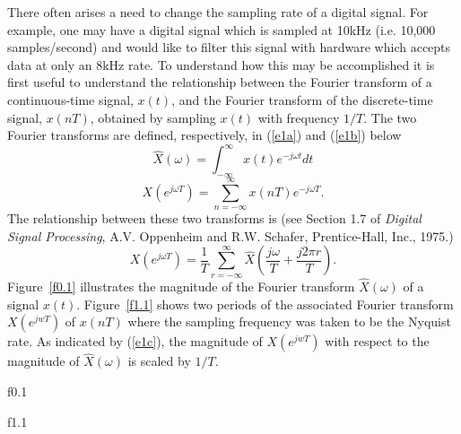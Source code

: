 	There often arises a need to change the sampling
rate of a digital signal.  For example, one may have a digital
signal which is sampled at 10kHz (i.e. 10,000 samples/second)
and would like to filter this signal with hardware 
which accepts data at only an 8kHz rate.  
To understand how this may be accomplished 
it is first useful to understand the relationship
between the Fourier transform of a continuous-time signal, $x(t)$,
and the Fourier transform of the discrete-time signal, $x(nT)$,
obtained by sampling $x(t)$ with frequency $1/T$.
The two Fourier transforms are defined, respectively, in (\ref{e1a})
and (\ref{e1b}) below
%
\begin{equation}
\hat{X}(\omega)=\int_{-\infty}^{\infty}x(t)e^{-j\omega t}dt
\label{e1a}
\end{equation}
%
%
\begin{equation}
X(e^{j\omega T})=\sum_{n=-\infty}^{\infty}x(nT)e^{-j\omega T}.
\label{e1b}
\end{equation}
%
The relationship between these two transforms is (see Section 1.7
of {\em Digital Signal Processing}, A.V. Oppenheim and R.W. Schafer,
Prentice-Hall, Inc., 1975.)
%
\begin{equation}
X(e^{j\omega T})=\frac{1}{T}\sum_{r=-\infty}^{\infty}
\hat{X}(\frac{j\omega}{T}+\frac{j2\pi r}{T}).
\label{e1c}
\end{equation}
%
Figure~\ref{f0.1}
illustrates the magnitude of the Fourier 
transform $\hat{X}(\omega)$ of a signal $x(t)$. 
Figure~\ref{f1.1} shows two periods of the associated Fourier 
transform $X(e^{jwT})$
of $x(nT)$ where the sampling frequency was taken
to be the Nyquist rate.  As indicated by (\ref{e1c}), 
the magnitude of $X(e^{jwT})$ with
respect to the magnitude of $\hat{X}(\omega)$ is scaled by $1/T$.
%

{f0.1}

%
%

{f1.1}


